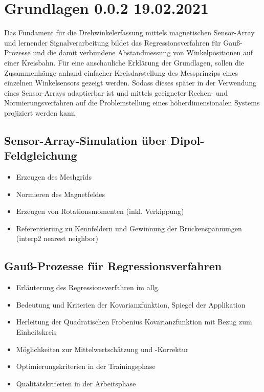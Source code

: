 %

\chapter{Grundlagen 0.0.2 19.02.2021}\label{ch:grundlagen}

Das Fundament für die Drehwinkelerfassung mittels magnetischen Sensor-Array und lernender Signalverarbeitung 
\cite{Schuethe2019}\cite{Schuethe2020a}\cite{Schuethe2020} bildet das Regressionsverfahren für Gauß-Prozesse 
\cite{Rasmussen2006} und die damit verbundene Abstandmessung von Winkelpositionen auf einer Kreisbahn.
Für eine anschauliche Erklärung der Grundlagen, sollen die Zusammenhänge anhand einfacher Kreisdarstellung des 
Messprinzips eines einzelnen Winkelsensors gezeigt werden. Sodass dieses später in der Verwendung eines Sensor-Arrays 
adaptierbar ist und mittels geeigneter Rechen- und Normierungsverfahren auf die Problemstellung eines 
höherdimensionalen Systems projiziert werden kann.











\section{Sensor-Array-Simulation über Dipol-Feldgleichung}\label{sec:sensor-array-simulation-dipol-feldgleichung}
	\begin{itemize}
		\item Erzeugen des Meshgrids
		\item Normieren des Magnetfeldes
		\item Erzeugen von Rotationsmomenten (inkl. Verkippung)
		\item Referenzierung zu Kennfeldern und Gewinnung der Brückenspannungen (interp2 nearest neighbor)
	\end{itemize}

\section{Gauß-Prozesse für Regressionsverfahren}\label{sec:gauss-prozesse-regressionsverfahren}
	\begin{itemize}
		\item Erläuterung des Regressionsverfahren im allg.
		\item Bedeutung und Kriterien der Kovarianzfunktion, Spiegel der Applikation
		\item Herleitung der Quadratischen Frobenius Kovarianzfunktion mit Bezug zum Einheitskreis
		\item Möglichkeiten zur Mittelwertschätzung und -Korrektur
		\item Optimierungskriterien in der Trainingsphase
		\item Qualitätskriterien in der Arbeitsphase
	\end{itemize}